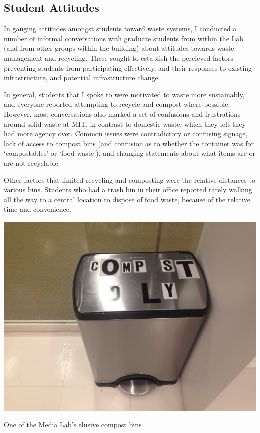 \documentclass[nofonts,nols,justified,nobib]{tufte-book}
\begin{document}
\subsection*{Student Attitudes}

In gauging attitudes amongst students toward waste systems, I conducted a number of informal conversations with graduate students from within the Lab (and from other groups within the building) about attitudes towards waste management and recycling. These sought to establish the percieved factors preventing students from participating effectively, and their responses to existing infrastructure, and potential infrastructure change.

In general, students that I spoke to were motivated to waste more sustainably, and everyone reported attempting to recycle and compost where possible. However, most conversations also marked a set of confusions and frustrations around solid waste at MIT, in contrast to domestic waste, which they felt they had more agency over. Common issues were contradictory or confusing signage, lack of access to compost bins (and confusion as to whether the container was for `compostables' or `food waste'), and changing statements about what items are or are not recyclable.

Other factors that limited recycling and composting were the relative distances to various bins. Students who had a trash bin in their office reported rarely walking all the way to a central location to dispose of food waste, because of the relative time and convenience.

\begin{marginfigure}
  \includegraphics[width=1\linewidth]{img/2/mit-bins/compost1.JPG}
    \caption{One of the Media Lab's elusive compost bins}
\end{marginfigure}
\end{document}

